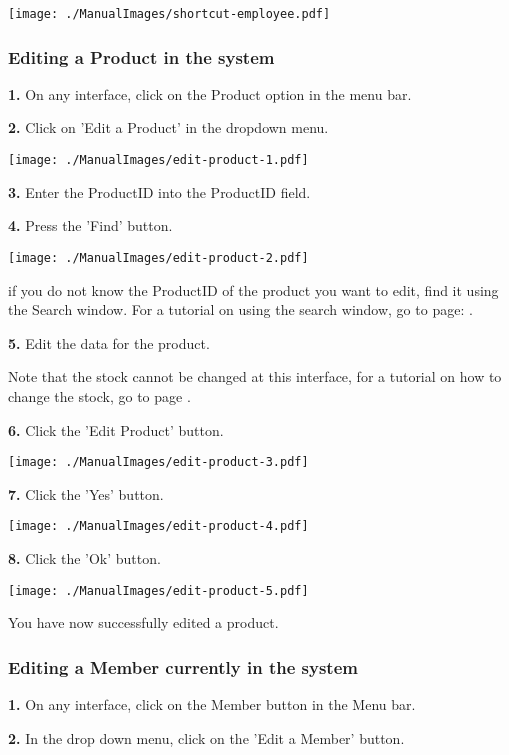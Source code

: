 \texttt{[image: ./ManualImages/shortcut-employee.pdf]}

\pagebreak
\subsubsection{Editing a Product in the system}
\label{fig:Editing a Product in the system}

\textbf{1.} On any interface, click on the Product option in the menu bar.

\textbf{2.} Click on 'Edit a Product' in the dropdown menu.

\texttt{[image: ./ManualImages/edit-product-1.pdf]}

\textbf{3.} Enter the ProductID into the ProductID field. 

\textbf{4.} Press the 'Find' button.

\texttt{[image: ./ManualImages/edit-product-2.pdf]}

if you do not know the ProductID of the product you want to edit, find it using the Search window. For a tutorial on using the search window, go to page: . 

\textbf{5.} Edit the data for the product.

Note that the stock cannot be changed at this interface, for a tutorial on how to change the stock, go to page .

\textbf{6.} Click the 'Edit Product' button.

\texttt{[image: ./ManualImages/edit-product-3.pdf]}

\textbf{7.} Click the 'Yes' button.

\texttt{[image: ./ManualImages/edit-product-4.pdf]}

\textbf{8.} Click the 'Ok' button.

\texttt{[image: ./ManualImages/edit-product-5.pdf]}

You have now successfully edited a product.


\pagebreak
\subsubsection{Editing a Member currently in the system}
\label{fig:Editing a Member currently in the system}

\textbf{1.} On any interface, click on the Member button in the Menu bar.

\textbf{2.} In the drop down menu, click on the 'Edit a Member' button.

